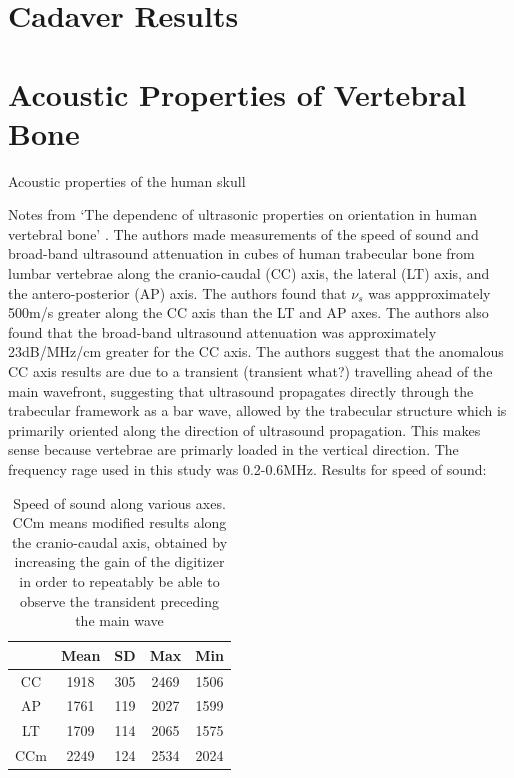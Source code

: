 \documentclass[11pt,titlepage]{article} %
\begin{document}
\section{Cadaver Results}

\section{Acoustic Properties of Vertebral Bone}

Acoustic properties of the human skull \cite{ fry1978acoustical}


Notes from `The dependenc of ultrasonic properties on orientation in human vertebral bone' \cite{nicholson1994dependence}.
The authors made measurements of the speed of sound and broad-band ultrasound attenuation in cubes of human trabecular bone from lumbar vertebrae along the cranio-caudal (CC) axis, the lateral (LT) axis, and the antero-posterior (AP) axis.
The authors found that $\nu_s$ was appproximately 500m/s greater along the CC axis than the LT and AP axes. The authors also found that the broad-band ultrasound attenuation was approximately 23dB/MHz/cm greater for the CC axis. The authors suggest that the anomalous CC axis results are due to a transient (transient what?) travelling ahead of the main wavefront, suggesting that ultrasound propagates directly through the trabecular framework as a bar wave, allowed by the  trabecular structure which is primarily oriented along the direction of ultrasound propagation. This makes sense because vertebrae are primarly loaded in the vertical direction. The frequency rage used in this study was 0.2-0.6MHz. Results for speed of sound:

\begin{table}[!h]
\begin{center}
  \begin{tabular}{| c | c | c | c | c | }
    \hline
     & Mean & SD & Max & Min \\ \hline
     CC & 1918 & 305 & 2469 & 1506 \\ 
     AP & 1761 & 119 & 2027 & 1599 \\ 
     LT & 1709 & 114 & 2065 & 1575 \\ 
     CCm & 2249 & 124 & 2534 & 2024 \\
    \hline
  \end{tabular}
\end{center}
\caption{Speed of sound along various axes. CCm means modified results along the cranio-caudal axis, obtained by increasing the gain of the digitizer in order to repeatably be able to observe the transident preceding the main wave}
\end{table}
 
\end{document}
